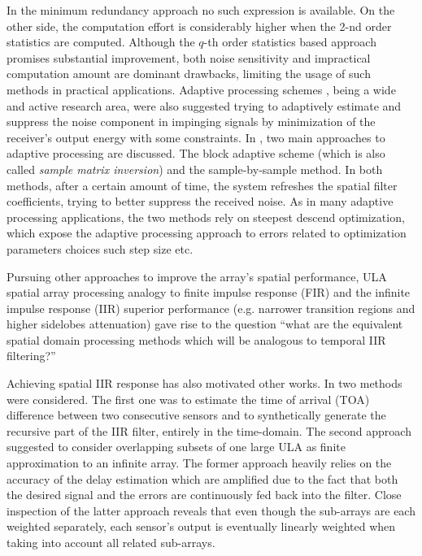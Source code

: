 In the minimum redundancy approach no such expression is available.
On the other side, the computation effort is considerably higher when the 2-nd order statistics are computed.
Although the $q$-th order statistics based approach promises substantial improvement, both noise sensitivity and impractical computation amount are dominant drawbacks, limiting the usage of such methods in practical applications.   
Adaptive processing schemes \cite{frost1972algorithm,manolakis2000statistical}, being a wide and active research area, were also suggested trying to adaptively estimate and suppress the noise component in impinging signals by minimization of the receiver's output energy with some constraints.
In \cite{manolakis2000statistical}, two main approaches to adaptive processing are discussed. The block adaptive scheme (which is also called \textit{sample matrix inversion}) and the sample-by-sample method.
In both methods, after a certain amount of time, the system refreshes the spatial filter coefficients, trying to better suppress the received noise.
As in many adaptive processing applications, the two methods rely on steepest descend optimization, which expose the adaptive processing approach to errors related to optimization parameters choices such step size etc. 
\par Pursuing other approaches to improve the array's spatial performance, ULA spatial array processing analogy to finite impulse response (FIR) \cite{van1988beamforming} and the infinite impulse response (IIR) superior performance (e.g. narrower transition regions and higher sidelobes attenuation) gave rise to the question ``what are the equivalent spatial domain processing methods which will be analogous to temporal IIR filtering?''
\par Achieving spatial IIR response has also motivated other works.
In \cite{wen2013extending} two methods were considered.
The first one was to estimate the time of arrival (TOA) difference between two consecutive sensors and to synthetically generate the recursive part of the IIR filter, entirely in the time-domain.
The second approach suggested to consider overlapping subsets of one large ULA as finite approximation to an infinite array. 
The former approach heavily relies on the accuracy of the delay estimation which are amplified due to the fact that both the desired signal and the errors are continuously fed back into the filter.
Close inspection of the latter approach reveals that even though the sub-arrays are each weighted separately, each sensor's output is eventually linearly weighted when taking into account all related sub-arrays.
